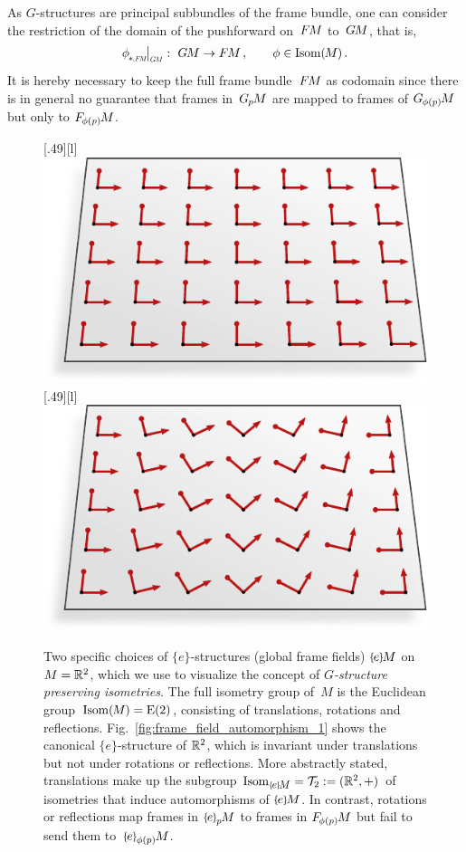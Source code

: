 As $G$-structures are principal subbundles of the frame bundle, one can consider the restriction of the domain of the pushforward on~$F\mkern-1.5muM$ to~$G\mkern-1.4muM$, that is,
\begin{align}
    \dphiFM \mkern-2mu \big|_{\scalebox{.58}{$\GM$}} :\ \GM \to \FM \,, \qquad \phi\in \IsomM \,.
\end{align}
It is hereby necessary to keep the full frame bundle~$F\mkern-1.5muM$ as codomain since there is in general no guarantee that frames in~$G_{\mkern-1.3mu p}\mkern-1.2muM$ are mapped to frames of $G_{\mkern-1.5mu \phi(p)}\mkern-1.5muM$ but only to $F_{\mkern-1.6mu \phi(p)}\mkern-1.3muM$.
\begin{figure}
    \centering
        [.49\linewidth][l]{
            \includegraphics[width=.46\textwidth]{figures/frame_field_isom_equiv_1.pdf}
        }
        [.49\linewidth][l]{
            \includegraphics[width=.46\textwidth]{figures/frame_field_isom_equiv_2.pdf}
        }
    \caption[]{\small
        Two specific choices of $\{e\}$-structures (global frame fields) $\eM$ on $M = \mathbb{R}^2$, which we use to visualize the concept of \emph{$G$-structure preserving isometries}.
        The full isometry group of~$M$ is the Euclidean group~$\operatorname{Isom}(\mkern-1.5mu M \mkern-.5mu)=\operatorname{E}(2)$, consisting of translations, rotations and reflections.
        Fig.~\ref{fig:frame_field_automorphism_1} shows the canonical $\{e\}$-structure of $\mathbb{R}^2$, which is invariant under translations but not under rotations or reflections.
        More abstractly stated, translations make up the subgroup $\IsomeM = \Trans_2 := (\R^2,+)$ of isometries that induce automorphisms of $\eM$.
        In contrast, rotations or reflections map frames in $\epM$ to frames in $F_{\mkern-1.6mu \phi(p)}\mkern-1.3muM$ but fail to send them to~$\ephipM$.
}
\end{figure}
